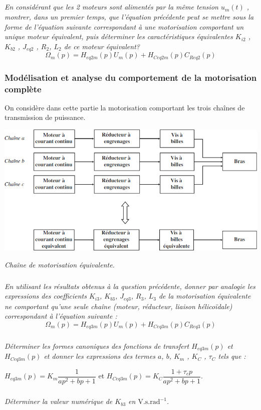 \documentclass[10pt,fleqn]{article} %
\begin{document}
\subparagraph{}
\textit{En considérant  que les 2 moteurs  sont alimentés  par la même  tension  $u_m(t)$ , montrer, dans un premier temps, que l’équation précédente peut se mettre  sous la forme de l’équation  suivante correspondant à une motorisation comportant un unique moteur équivalent, puis déterminer les caractéristiques équivalentes $K_{i 2}$ , $K_{b 2}$ , $J_{eq2}$ , $R_2$, $L_2$  de ce moteur équivalent?}
$$
\Omega_m(p)=H_{eq2m}(p)U_m(p)+H_{Ceq2m}(p)C_{Req2}(p)
$$

\subsubsection{Modélisation et analyse du comportement de la motorisation complète}

On considère dans cette partie la motorisation comportant les trois chaînes de transmission de puissance.

\begin{center}
\includegraphics[width=.7\linewidth]{images_01/fig_07}

\textit{Chaîne de motorisation équivalente.}
\end{center}

\subparagraph{}
\textit{En utilisant les résultats obtenus à la question précédente, donner par analogie les expressions des coefficients  $K_{i 3}$, $K_{b3}$, $J_{eq3}$, $R_3$, $L_3$  de la motorisation équivalente ne comportant qu’une seule chaîne (moteur, réducteur, liaison hélicoïdale) correspondant à l’équation suivante :}
$$
\Omega_m(p)=H_{eq3m}(p)U_m(p)+H_{Ceq3m}(p)C_{Req3}(p)
$$

\subparagraph{}
\textit{Déterminer les formes canoniques des fonctions de transfert $H_{eq3m}(p)$ et $H_{Ceq3m}(p)$ et donner les expressions des termes $a$, $b$, $K_m$ , $K_C$ , $\tau_C$  tels que :}

$H_{eq3m}(p)=K_m\dfrac{1}{ap^2+bp+1}$ et $H_{Ceq3m}(p)=K_C\dfrac{1+\tau_c p}{ap^2+bp+1}$.



\subparagraph{}
\textit{Déterminer la valeur numérique de $K_{b3}$  en $\text{V.s.rad}^{-1}$.}
\end{document}
